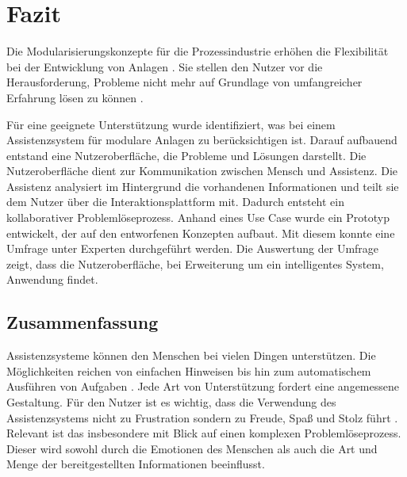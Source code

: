 \chapter{Fazit}
\label{Zusammenfassung}
Die Modularisierungskonzepte für die Prozessindustrie erhöhen die Flexibilität bei der Entwicklung von Anlagen \cite{ZVEI2015}. Sie stellen den Nutzer vor die Herausforderung, Probleme nicht mehr auf Grundlage von umfangreicher Erfahrung lösen zu können \cite{Muller2018}.

Für eine geeignete Unterstützung wurde identifiziert, was bei einem Assistenzsystem für modulare Anlagen zu berücksichtigen ist. Darauf aufbauend entstand eine Nutzeroberfläche, die Probleme und Lösungen darstellt. Die Nutzeroberfläche dient zur Kommunikation zwischen Mensch und Assistenz. Die Assistenz analysiert im Hintergrund die vorhandenen Informationen und teilt sie dem Nutzer über die Interaktionsplattform mit. Dadurch entsteht ein kollaborativer Problemlöseprozess. Anhand eines Use Case wurde ein Prototyp entwickelt, der auf den entworfenen Konzepten aufbaut. Mit diesem konnte eine Umfrage unter Experten durchgeführt werden. Die Auswertung der Umfrage zeigt, dass die Nutzeroberfläche, bei Erweiterung um ein intelligentes System, Anwendung findet.

\section{Zusammenfassung}
Assistenzsysteme können den Menschen bei vielen Dingen unterstützen. Die Möglichkeiten reichen von einfachen Hinweisen bis hin zum automatischem Ausführen von Aufgaben \cite{Wandke2005}. Jede Art von Unterstützung fordert eine angemessene Gestaltung. Für den Nutzer ist es wichtig, dass die Verwendung des Assistenzsystems nicht zu Frustration sondern zu Freude, Spaß und Stolz führt \cite{Hassenzahl2008}. Relevant ist das insbesondere mit Blick auf einen komplexen Problemlöseprozess. Dieser wird sowohl durch die Emotionen des Menschen als auch die Art und Menge der bereitgestellten Informationen beeinflusst. 

